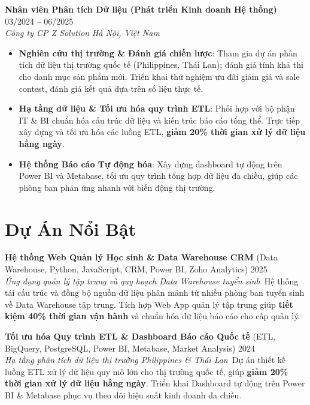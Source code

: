 \documentclass[11pt,a4paper]{article}
\begin{document}
\textbf{Nhân viên Phân tích Dữ liệu (Phát triển Kinh doanh Hệ thống)} \hfill 03/2024 -- 06/2025\\
\textit{Công ty CP Z Solution} \hfill \textit{Hà Nội, Việt Nam}
\begin{itemize}
  \item \textbf{Nghiên cứu thị trường \& Đánh giá chiến lược}: Tham gia dự án phân tích dữ liệu thị trường quốc tế (Philippines, Thái Lan); đánh giá tính khả thi cho danh mục sản phẩm mới. Triển khai thử nghiệm ưu đãi giảm giá và sale contest, đánh giá kết quả dựa trên số liệu thực tế.
  \item \textbf{Hạ tầng dữ liệu \& Tối ưu hóa quy trình ETL}: Phối hợp với bộ phận IT \& BI chuẩn hóa cấu trúc dữ liệu và kiến trúc báo cáo tổng thể. Trực tiếp xây dựng và tối ưu hóa các luồng ETL, \textbf{giảm 20\% thời gian xử lý dữ liệu hằng ngày}.
  \item \textbf{Hệ thống Báo cáo Tự động hóa}: Xây dựng dashboard tự động trên Power BI và Metabase, tối ưu quy trình tổng hợp dữ liệu đa chiều, giúp các phòng ban phản ứng nhanh với biến động thị trường.
\end{itemize}
\vspace{4pt}

\section*{Dự Án Nổi Bật}
\color{darkgray} \textbf{Hệ thống Web Quản lý Học sinh \& Data Warehouse CRM} (Data Warehouse, Python, JavaScript, CRM, Power BI, Zoho Analytics) \hfill 2025\\
\textit{Ứng dụng quản lý tập trung và quy hoạch Data Warehouse tuyển sinh}\
Hệ thống tái cấu trúc và đồng bộ nguồn dữ liệu phân mảnh từ nhiều phòng ban tuyển sinh về Data Warehouse tập trung. Tích hợp Web App quản lý tập trung giúp \textbf{tiết kiệm 40\% thời gian vận hành} và chuẩn hóa dữ liệu báo cáo cho cấp quản lý.
\vspace{4pt}

\textbf{Tối ưu hóa Quy trình ETL \& Dashboard Báo cáo Quốc tế} (ETL, BigQuery, PostgreSQL, Power BI, Metabase, Market Analysis) \hfill 2024\\
\textit{Hạ tầng phân tích dữ liệu thị trường Philippines \& Thái Lan}\
Dự án thiết kế luồng ETL xử lý dữ liệu quy mô lớn cho thị trường quốc tế, giúp \textbf{giảm 20\% thời gian xử lý dữ liệu hằng ngày}. Triển khai Dashboard tự động trên Power BI \& Metabase phục vụ theo dõi hiệu suất kinh doanh đa chiều.
\vspace{4pt}
\end{document}
